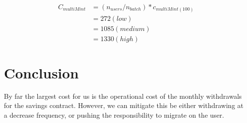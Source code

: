\documentclass[a4paper,english]{article}
\begin{document}
\begin{equation}
\begin{aligned}
  C_{multiMint} &= (n_{users}/n_{batch}) * c_{multiMint(100)} \\
                &= 272(low) \\
                &= 1085(medium) \\
                &= 1330(high)
\end{aligned}
\end{equation}

\section{Conclusion}

By far the largest cost for us is the operational cost of the monthly withdrawals for the savings contract. However, we can mitigate this be either withdrawing at a decrease frequency, or pushing the responsibility to migrate on the user.
\end{document}
